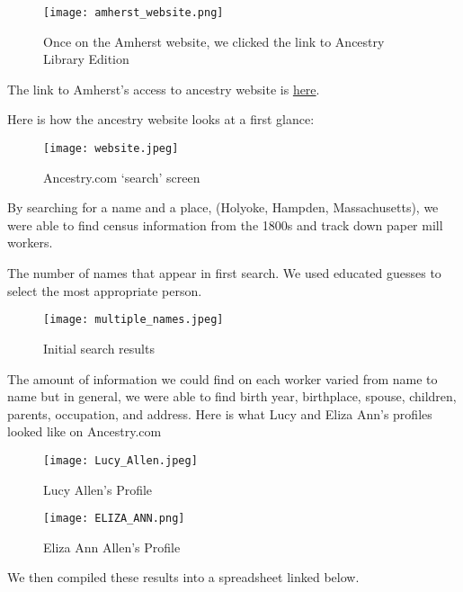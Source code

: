\documentclass[
  letterpaper,
  DIV=11,
  numbers=noendperiod]{scrartcl}
\begin{document}
\begin{figure}

{\centering \texttt{[image: amherst\_website.png]}

}

\caption{\label{fig-sample9}Once on the Amherst website, we clicked the
link to Ancestry Library Edition}

\end{figure}

The link to Amherst's access to ancestry website is
\href{https://libguides.amherst.edu/c.php?g=944984\&p=6812570}{here}.

Here is how the ancestry website looks at a first glance:

\begin{figure}

{\centering \texttt{[image: website.jpeg]}

}

\caption{\label{fig-sample10}Ancestry.com `search' screen}

\end{figure}

By searching for a name and a place, (Holyoke, Hampden, Massachusetts),
we were able to find census information from the 1800s and track down
paper mill workers.

The number of names that appear in first search. We used educated
guesses to select the most appropriate person.

\begin{figure}

{\centering \texttt{[image: multiple\_names.jpeg]}

}

\caption{\label{fig-sample11}Initial search results}

\end{figure}

The amount of information we could find on each worker varied from name
to name but in general, we were able to find birth year, birthplace,
spouse, children, parents, occupation, and address. Here is what Lucy
and Eliza Ann's profiles looked like on Ancestry.com

\begin{figure}

{\centering \texttt{[image: Lucy\_Allen.jpeg]}

}

\caption{\label{fig-sample6}Lucy Allen's Profile}

\end{figure}

\begin{figure}

{\centering \texttt{[image: ELIZA\_ANN.png]}

}

\caption{\label{fig-sample12}Eliza Ann Allen's Profile}

\end{figure}

We then compiled these results into a spreadsheet linked below.
\end{document}
